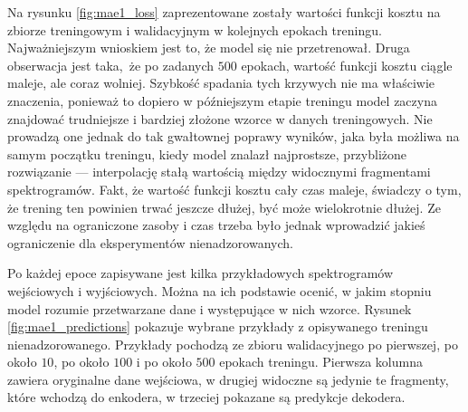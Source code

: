 Na rysunku \ref{fig:mae1_loss} zaprezentowane zostały wartości funkcji kosztu na zbiorze treningowym i walidacyjnym w kolejnych epokach treningu. Najważniejszym wnioskiem jest to, że model się nie przetrenował. Druga obserwacja jest taka, że po zadanych $500$ epokach, wartość funkcji kosztu ciągle maleje, ale coraz wolniej. Szybkość spadania tych krzywych nie ma właściwie znaczenia, ponieważ to dopiero w późniejszym etapie treningu model zaczyna znajdować trudniejsze i bardziej złożone wzorce w danych treningowych. Nie prowadzą one jednak do tak gwałtownej poprawy wyników, jaka była możliwa na samym początku treningu, kiedy model znalazł najprostsze, przybliżone rozwiązanie --- interpolację stałą wartością między widocznymi fragmentami spektrogramów. Fakt, że wartość funkcji kosztu cały czas maleje, świadczy o tym, że trening ten powinien trwać jeszcze dłużej, być może wielokrotnie dłużej. Ze względu na ograniczone zasoby i czas trzeba było jednak wprowadzić jakieś ograniczenie dla eksperymentów nienadzorowanych.

Po każdej epoce zapisywane jest kilka przykładowych spektrogramów wejściowych i wyjściowych. Można na ich podstawie ocenić, w jakim stopniu model rozumie przetwarzane dane i występujące w nich wzorce. Rysunek \ref{fig:mae1_predictions} pokazuje wybrane przykłady z opisywanego treningu nienadzorowanego. Przykłady pochodzą ze zbioru walidacyjnego po pierwszej, po około $10$, po około $100$ i po około $500$ epokach treningu. Pierwsza kolumna zawiera oryginalne dane wejściowa, w drugiej widoczne są jedynie te fragmenty, które wchodzą do enkodera, w trzeciej pokazane są predykcje dekodera.

